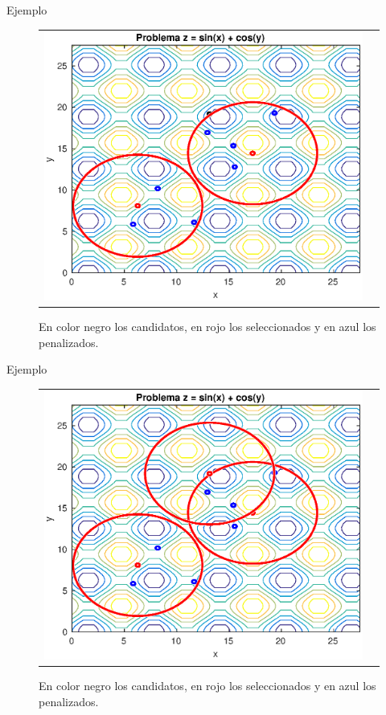 \documentclass{beamer}
\begin{document}
\begin{frame}{Ejemplo}
\begin{figure}[H]
  \centering
  \begin{tabular}{c c}
   \includegraphics[scale=0.6]{Images/3.eps} 
  \end{tabular}
  \caption{\scriptsize En color negro los candidatos, en rojo los seleccionados y en azul los penalizados.}
\end{figure}
\end{frame}

\begin{frame}{Ejemplo}
\begin{figure}[H]
  \centering
  \begin{tabular}{c c}
   \includegraphics[scale=0.6]{Images/4.eps} 
  \end{tabular}
  \caption{\scriptsize En color negro los candidatos, en rojo los seleccionados y en azul los penalizados.}
\end{figure}
\end{frame}
\end{document}
